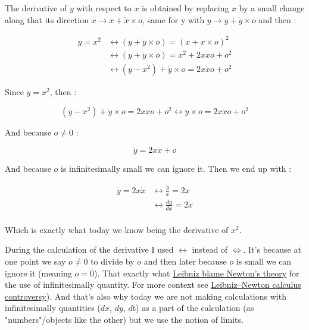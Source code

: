 \documentclass[12pt]{article}
\begin{document}
The derivative of $y$ with respect to $x$ is obtained by replacing $x$ by a small change along that its direction $x \rightarrow x + \dot{x} \times o$, same for y with $y \rightarrow y + \dot{y} \times o$ and then :

\begin{equation*}
    \begin{split}
        y = x^2 & \leftrightarrow  (y + \dot{y} \times o) = (x + \dot{x} \times o)^2 \\
            & \leftrightarrow  (y + \dot{y} \times o) = x^2 +2x\dot{x}o + o^2 \\
            & \leftrightarrow  (y - x^2) + \dot{y} \times o = 2x\dot{x}o + o^2
    \end{split}
\end{equation*}

Since $y=x^2$, then :

$$
(y - x^2) + \dot{y} \times o = 2x\dot{x}o + o^2  \leftrightarrow \dot{y} \times o = 2x\dot{x}o + o^2 
$$

And because $o \neq 0$ : 


$$
\dot{y} = 2x\dot{x} + o
$$

And because $o$ is infinitesimally small we can ignore it. Then we end up with :

\begin{equation*}
    \begin{split}
        \dot{y} = 2x\dot{x} & \leftrightarrow \frac{\dot{y}}{\dot{x}} = 2x\\
                            & \leftrightarrow \frac{dy}{dx} = 2x\\
    \end{split}
\end{equation*}

Which is exactly what today we know being the derivative of $x^2$.

During the calculation of the derivative I used $\leftrightarrow$ instead of $\Leftrightarrow$. It's because at one point we say $o \neq 0$ to divide by $o$ and then later because $o$ is small we can ignore it (meaning $o=0$). That exactly what \href{https://en.wikipedia.org/wiki/History_of_calculus}{Leibniz blame Newton's theory} for the use of infinitesimally quantity. For more context see \href{https://en.wikipedia.org/wiki/Leibniz\%E2\%80\%93Newton_calculus_controversy}{Leibniz–Newton calculus controversy}). And that's also why today we are not making calculations with infinitesimally quantities ($dx$, $dy$, $d$t) as a part of the calculation (as "numbers"/objects like the other) but we use the notion of limits.
\end{document}
